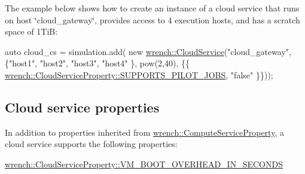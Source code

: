 The example below shows how to create an instance of a cloud service that runs on host \char`\"{}cloud\+\_\+gateway\char`\"{}, provides access to 4 execution hosts, and has a scratch space of 1\+TiB\+:


\begin{DoxyCode}
\textcolor{keyword}{auto} cloud\_cs = simulation.add(
          \textcolor{keyword}{new} \hyperlink{classwrench_1_1_cloud_service}{wrench::CloudService}(\textcolor{stringliteral}{"cloud\_gateway"}, \{\textcolor{stringliteral}{"host1"}, \textcolor{stringliteral}{"host2"}, \textcolor{stringliteral}{"host3"}, \textcolor{stringliteral}{"host4"}
      \}, pow(2,40),
                                   \{\{
      \hyperlink{classwrench_1_1_compute_service_property_af0abab1e3bce4932c4482031f0c31ce8}{wrench::CloudServiceProperty::SUPPORTS\_PILOT\_JOBS}, \textcolor{stringliteral}{"false"}
      \}\}));
\end{DoxyCode}
\hypertarget{guide-cloud_guide-cloud-creating-properties}{}\subsection{Cloud service properties}\label{guide-cloud_guide-cloud-creating-properties}
In addition to properties inherited from {\ttfamily \hyperlink{classwrench_1_1_compute_service_property}{wrench\+::\+Compute\+Service\+Property}}, a cloud service supports the following properties\+:


\begin{DoxyItemize}
\item {\ttfamily \hyperlink{classwrench_1_1_cloud_service_property_a7e2fddc7f539dedff89fb41635a5b200}{wrench\+::\+Cloud\+Service\+Property\+::\+V\+M\+\_\+\+B\+O\+O\+T\+\_\+\+O\+V\+E\+R\+H\+E\+A\+D\+\_\+\+I\+N\+\_\+\+S\+E\+C\+O\+N\+DS}} 
\end{DoxyItemize}